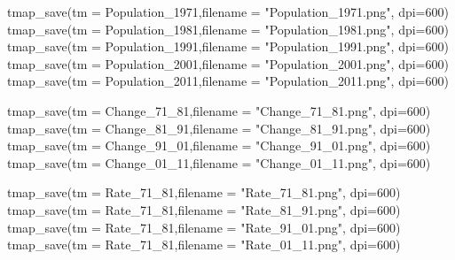 \documentclass[
]{article}
\newenvironment{Shaded}{\begin{snugshade}}{\end{snugshade}}
\newcommand{\AttributeTok}[1]{\textcolor[rgb]{0.77,0.63,0.00}{#1}}
\newcommand{\DecValTok}[1]{\textcolor[rgb]{0.00,0.00,0.81}{#1}}
\newcommand{\FunctionTok}[1]{\textcolor[rgb]{0.00,0.00,0.00}{#1}}
\newcommand{\NormalTok}[1]{#1}
\newcommand{\StringTok}[1]{\textcolor[rgb]{0.31,0.60,0.02}{#1}}
\begin{document}
\begin{Shaded}
\begin{Highlighting}[]
\FunctionTok{tmap\_save}\NormalTok{(}\AttributeTok{tm =}\NormalTok{ Population\_1971,}\AttributeTok{filename =} \StringTok{"Population\_1971.png"}\NormalTok{, }\AttributeTok{dpi=}\DecValTok{600}\NormalTok{)}
\FunctionTok{tmap\_save}\NormalTok{(}\AttributeTok{tm =}\NormalTok{ Population\_1981,}\AttributeTok{filename =} \StringTok{"Population\_1981.png"}\NormalTok{, }\AttributeTok{dpi=}\DecValTok{600}\NormalTok{)}
\FunctionTok{tmap\_save}\NormalTok{(}\AttributeTok{tm =}\NormalTok{ Population\_1991,}\AttributeTok{filename =} \StringTok{"Population\_1991.png"}\NormalTok{, }\AttributeTok{dpi=}\DecValTok{600}\NormalTok{)}
\FunctionTok{tmap\_save}\NormalTok{(}\AttributeTok{tm =}\NormalTok{ Population\_2001,}\AttributeTok{filename =} \StringTok{"Population\_2001.png"}\NormalTok{, }\AttributeTok{dpi=}\DecValTok{600}\NormalTok{)}
\FunctionTok{tmap\_save}\NormalTok{(}\AttributeTok{tm =}\NormalTok{ Population\_2011,}\AttributeTok{filename =} \StringTok{"Population\_2011.png"}\NormalTok{, }\AttributeTok{dpi=}\DecValTok{600}\NormalTok{)}

\FunctionTok{tmap\_save}\NormalTok{(}\AttributeTok{tm =}\NormalTok{ Change\_71\_81,}\AttributeTok{filename =} \StringTok{"Change\_71\_81.png"}\NormalTok{, }\AttributeTok{dpi=}\DecValTok{600}\NormalTok{)}
\FunctionTok{tmap\_save}\NormalTok{(}\AttributeTok{tm =}\NormalTok{ Change\_81\_91,}\AttributeTok{filename =} \StringTok{"Change\_81\_91.png"}\NormalTok{, }\AttributeTok{dpi=}\DecValTok{600}\NormalTok{)}
\FunctionTok{tmap\_save}\NormalTok{(}\AttributeTok{tm =}\NormalTok{ Change\_91\_01,}\AttributeTok{filename =} \StringTok{"Change\_91\_01.png"}\NormalTok{, }\AttributeTok{dpi=}\DecValTok{600}\NormalTok{)}
\FunctionTok{tmap\_save}\NormalTok{(}\AttributeTok{tm =}\NormalTok{ Change\_01\_11,}\AttributeTok{filename =} \StringTok{"Change\_01\_11.png"}\NormalTok{, }\AttributeTok{dpi=}\DecValTok{600}\NormalTok{)}

\FunctionTok{tmap\_save}\NormalTok{(}\AttributeTok{tm =}\NormalTok{ Rate\_71\_81,}\AttributeTok{filename =} \StringTok{"Rate\_71\_81.png"}\NormalTok{, }\AttributeTok{dpi=}\DecValTok{600}\NormalTok{)}
\FunctionTok{tmap\_save}\NormalTok{(}\AttributeTok{tm =}\NormalTok{ Rate\_71\_81,}\AttributeTok{filename =} \StringTok{"Rate\_81\_91.png"}\NormalTok{, }\AttributeTok{dpi=}\DecValTok{600}\NormalTok{)}
\FunctionTok{tmap\_save}\NormalTok{(}\AttributeTok{tm =}\NormalTok{ Rate\_71\_81,}\AttributeTok{filename =} \StringTok{"Rate\_91\_01.png"}\NormalTok{, }\AttributeTok{dpi=}\DecValTok{600}\NormalTok{)}
\FunctionTok{tmap\_save}\NormalTok{(}\AttributeTok{tm =}\NormalTok{ Rate\_71\_81,}\AttributeTok{filename =} \StringTok{"Rate\_01\_11.png"}\NormalTok{, }\AttributeTok{dpi=}\DecValTok{600}\NormalTok{)}
\end{Highlighting}
\end{Shaded}
\end{document}
